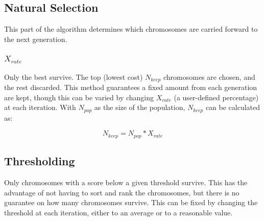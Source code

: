 \subsection{Natural Selection}
This part of the algorithm determines which chromosomes are carried forward to the next generation.

\subsubsection{$X_{rate}$}
Only the best survive. The top (lowest cost) $N_{keep}$ chromosomes are chosen, and the rest discarded. This method guarantees a fixed amount from each generation are kept, though this can be varied by changing $X_{rate}$ (a user-defined percentage) at each iteration. With $N_{pop}$ as the size of the population, $N_{keep}$ can be calculated as:

\[
    N_{keep} = N_{pop} * X_{rate}
\]

\subsection{Thresholding}
Only chromosomes with a score below a given threshold survive. This has the advantage of not having to sort and rank the chromosomes, but there is no guarantee on how many chromosomes survive. This can be fixed by changing the threshold at each iteration, either to an average or to a reasonable value.